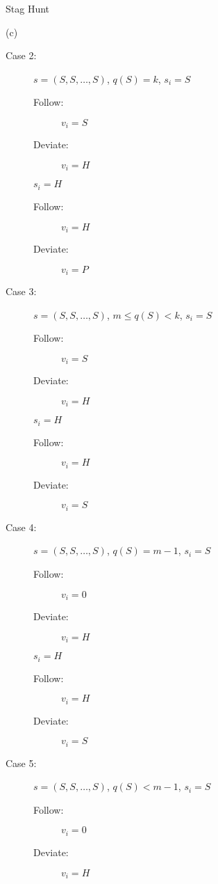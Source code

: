 \documentclass[10pt]{extarticle}
\begin{document}
\begin{problem}{Stag Hunt}
\begin{problem}{(c)}
\begin{multicols}{2}
\begin{description}
          \item[Case 2:] $s = (S,S,\dots,S)$, $q(S) = k$, $s_i = S$
            \begin{description}
              \item[Follow:] $v_i = S$
              \item[Deviate:] $v_i = H$
            \end{description}
            $s_i = H$
            \begin{description}
              \item[Follow:] $v_i = H$
              \item[Deviate:] $v_i = P$
            \end{description} %
          \item[Case 3:] $s = (S,S,\dots,S)$, $m\leq q(S) < k$, $s_i = S$
            \begin{description}
              \item[Follow:] $v_i = S$
              \item[Deviate:] $v_i = H$
            \end{description}
            $s_i = H$
            \begin{description}
              \item[Follow:] $v_i = H$
              \item[Deviate:] $v_i = S$
            \end{description} 
          \item[Case 4:] $s = (S,S,\dots,S)$, $q(S) = m-1$, $s_i = S$
            \begin{description}
              \item[Follow:] $v_i = 0$
              \item[Deviate:] $v_i = H$
            \end{description}
            $s_i = H$
            \begin{description}
              \item[Follow:] $v_i = H$
              \item[Deviate:] $v_i = S$
            \end{description}
          \item[Case 5:] $s = (S,S,\dots,S)$, $q(S) < m-1$, $s_i = S$
            \begin{description}
              \item[Follow:] $v_i = 0$
              \item[Deviate:] $v_i = H$
            \end{description}

\end{description}
\end{multicols}
\end{problem}
\end{problem}
\end{document}
